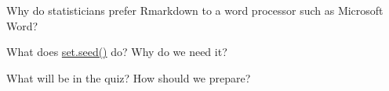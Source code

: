 \documentclass{beamer}
\newcommand\code[1]{\url{#1}}
\begin{document}
\begin{frame}

Why do statisticians prefer Rmarkdown to a word processor such as Microsoft Word?

\end{frame}

\begin{frame}

What does \code{set.seed()} do? Why do we need it?

\end{frame}


\begin{frame}

What will be in the quiz? How should we prepare?

\end{frame}
\end{document}
